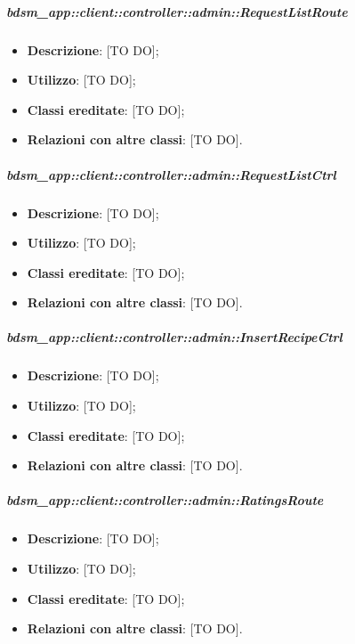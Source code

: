 		\subparagraph{bdsm\_app::client::controller::admin::RequestListRoute} %
		\label{subp:bdsm_app_client_controller_admin_recipelistroute}
			\begin{itemize}
				\item \textbf{Descrizione}: [TO DO];
				\item \textbf{Utilizzo}: [TO DO];
				\item \textbf{Classi ereditate}: [TO DO];
				\item \textbf{Relazioni con altre classi}: [TO DO].
			\end{itemize}

		\subparagraph{bdsm\_app::client::controller::admin::RequestListCtrl} %
		\label{subp:bdsm_app_client_controller_admin_requestlistctrl}
			\begin{itemize}
				\item \textbf{Descrizione}: [TO DO];
				\item \textbf{Utilizzo}: [TO DO];
				\item \textbf{Classi ereditate}: [TO DO];
				\item \textbf{Relazioni con altre classi}: [TO DO].
			\end{itemize}

		\subparagraph{bdsm\_app::client::controller::admin::InsertRecipeCtrl} %
		\label{subp:bdsm_app_client_controller_admin_insertctrl}
			\begin{itemize}
				\item \textbf{Descrizione}: [TO DO];
				\item \textbf{Utilizzo}: [TO DO];
				\item \textbf{Classi ereditate}: [TO DO];
				\item \textbf{Relazioni con altre classi}: [TO DO].
			\end{itemize}

		\subparagraph{bdsm\_app::client::controller::admin::RatingsRoute} %
		\label{subp:bdsm_app_client_controller_admin_ratingsroute}
			\begin{itemize}
				\item \textbf{Descrizione}: [TO DO];
				\item \textbf{Utilizzo}: [TO DO];
				\item \textbf{Classi ereditate}: [TO DO];
				\item \textbf{Relazioni con altre classi}: [TO DO].
			\end{itemize}

